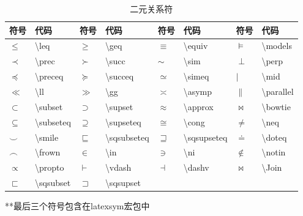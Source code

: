 \documentclass[UTF8,fontset=ubuntu]{ctexart}
\begin{document}
\begin{table}[H]
\begin{tabular}{l l l l l l l l}
    \hline
    符号 & 代码 & 符号 & 代码 & 符号 & 代码 & 符号 & 代码\\\hline
    $\leq$ & \textbackslash leq & $\geq$ & \textbackslash geq & $\equiv$ & \textbackslash equiv & $\models$ & \textbackslash models\\
    $\prec$ & \textbackslash prec & $\succ$ & \textbackslash succ & $\sim$ & \textbackslash sim & $\perp$ & \textbackslash perp\\
    $\preceq$ & \textbackslash preceq & $\succeq$ & \textbackslash succeq & $\simeq$ & \textbackslash simeq & $\mid$ & \textbackslash mid\\
    $\ll$ & \textbackslash ll & $\gg$ & \textbackslash gg & $\asymp$ & \textbackslash asymp & $\parallel$ & \textbackslash parallel\\
    $\subset$ & \textbackslash subset & $\supset$ & \textbackslash supset & $\approx$ & \textbackslash approx & $\bowtie$ & \textbackslash bowtie\\
    $\subseteq$ & \textbackslash subseteq & $\supseteq$ & \textbackslash supseteq & $\cong$ & \textbackslash cong & $\neq$ & \textbackslash neq\\
    $\smile$ & \textbackslash smile & $\sqsubseteq$ & \textbackslash sqsubseteq & $\sqsupseteq$ & \textbackslash sqsupseteq & $\doteq$ & \textbackslash doteq\\
    $\frown$ & \textbackslash frown & $\in$ & \textbackslash in & $\ni$ & \textbackslash ni & $\notin$ & \textbackslash notin\\
    $\propto$ & \textbackslash propto & $\vdash$ & \textbackslash vdash & $\dashv$ & \textbackslash dashv & $\Join$ & \textbackslash Join\\
    $\sqsubset$ & \textbackslash sqsubset & $\sqsupset$ & \textbackslash sqsupset\\
    \hline
\end{tabular}
**最后三个符号包含在latexsym宏包中
\caption{二元关系符}
\end{table}
\end{document}
